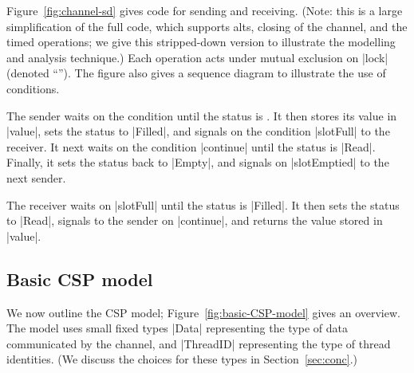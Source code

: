 
Figure~\ref{fig:channel-sd} gives code for sending and receiving.  (Note: this
is a large simplification of the full code, which supports alts, closing of
the channel, and the timed operations; we give this stripped-down version to
illustrate the modelling and analysis technique.)  Each operation acts under
mutual exclusion on |lock| (denoted ``'').  The
figure also gives a sequence diagram to illustrate the use of conditions.

The sender waits on the condition  until the status is
.  It then stores its value in |value|, sets the status to
|Filled|, and signals on the condition |slotFull| to the receiver.  It next 
waits on the condition |continue| until the status is |Read|.  Finally, it
sets the status back to |Empty|, and signals on |slotEmptied| to the next
sender.

The receiver waits on |slotFull| until the status is |Filled|.  It then sets
the status to |Read|, signals to the sender on |continue|, and returns the
value stored in |value|.


\subsection{Basic CSP model}
\label{sec:basic-csp-model}

We now outline the CSP model; Figure~\ref{fig:basic-CSP-model} gives an
overview.  The model uses small fixed types |Data| representing the type of
data communicated by the channel, and |ThreadID| representing the type of
thread identities.  (We discuss the choices for these types in
Section~\ref{sec:conc}.)


